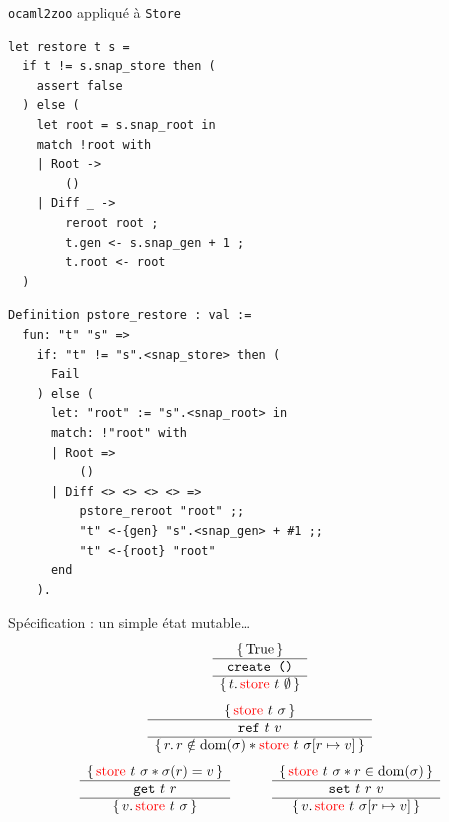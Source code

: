 \documentclass[usenames,dvipsnames]{beamer}
\begin{document}

\begin{frame}[fragile]{\texttt{ocaml2zoo} appliqué à \texttt{Store}}
\centering
\scriptsize
\hspace{-6mm}
\begin{minipage}[t]{.45\textwidth}
\begin{verbatim}
let restore t s =
  if t != s.snap_store then (
    assert false
  ) else (
    let root = s.snap_root in
    match !root with
    | Root ->
        ()
    | Diff _ ->
        reroot root ;
        t.gen <- s.snap_gen + 1 ;
        t.root <- root
  )
\end{verbatim}
\end{minipage}
\hfill
\begin{minipage}[t]{.55\textwidth}
\begin{verbatim}
Definition pstore_restore : val :=
  fun: "t" "s" =>
    if: "t" != "s".<snap_store> then (
      Fail
    ) else (
      let: "root" := "s".<snap_root> in
      match: !"root" with
      | Root =>
          ()
      | Diff <> <> <> <> =>
          pstore_reroot "root" ;;
          "t" <-{gen} "s".<snap_gen> + #1 ;;
          "t" <-{root} "root"
      end
    ).
\end{verbatim}
\end{minipage}
\end{frame}


\begin{frame}{Spécification : un simple état mutable\dots}
\large
\[
  \begin{array}{c} \left\lbrace\, 
    \mathrm{True}
   \,\right\rbrace \\ \hline 
    \texttt{create ()}
   \\ \hline \left\lbrace\, 
    t
   \ldotp 
    \textcolor{red}{\mathrm{store}}\ t\ \emptyset
   \,\right\rbrace \end{array}
\]
\vfill
\[
  \begin{array}{c} \left\lbrace\, 
    \textcolor{red}{\mathrm{store}}\ t\ \sigma
   \,\right\rbrace \\ \hline 
    \texttt{ref}\ t\ v
   \\ \hline \left\lbrace\, 
    r
   \ldotp 
    r \notin \mathrm{dom} (\sigma) \ast
    \textcolor{red}{\mathrm{store}}\ t\ \sigma[r \mapsto v]
   \,\right\rbrace \end{array}
\]
\vfill
\[
  \begin{array}{cccc}
      \begin{array}{c} \left\lbrace\, 
        \textcolor{red}{\mathrm{store}}\ t\ \sigma \ast
        \sigma (r) = v
       \,\right\rbrace \\ \hline 
        \texttt{get}\ t\ r
       \\ \hline \left\lbrace\, 
        v
       \ldotp 
        \textcolor{red}{\mathrm{store}}\ t\ \sigma
       \,\right\rbrace \end{array}
    &&&
      \begin{array}{c} \left\lbrace\, 
        \textcolor{red}{\mathrm{store}}\ t\ \sigma \ast
        r \in \mathrm{dom} (\sigma)
       \,\right\rbrace \\ \hline 
        \texttt{set}\ t\ r\ v
       \\ \hline \left\lbrace\, 
        v
       \ldotp 
        \textcolor{red}{\mathrm{store}}\ t\ \sigma[r \mapsto v]
       \,\right\rbrace \end{array}
  \end{array}
\]
\end{frame}
\end{document}
